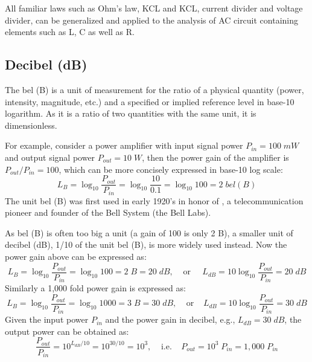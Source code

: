 \documentclass{article}
\begin{document}
All familiar laws such as Ohm's law, KCL and KCL, current divider and voltage
divider, can be generalized and applied to the analysis of AC circuit containing
elements such as L, C as well as R.

\subsection*{Decibel (dB)}

The bel (B) is a unit of measurement for the ratio of a physical quantity 
(power, intensity, magnitude, etc.) and a specified or implied reference 
level in base-10 logarithm. As it is a ratio of two quantities with the same 
unit, it is dimensionless. 

For example, consider a power amplifier with input signal power $P_{in}=100\; mW$ 
and output signal power $P_{out}=10\;W$, then the power gain of the amplifier is 
$P_{out}/P_{in}=100$, which can be more concisely expressed in base-10 log scale:
\begin{equation}
L_B=\log_{10} \frac{P_{out}}{P_{in}}=\log_{10} \frac{10}{0.1} =\log_{10} 100 =2\; bel(B)
\end{equation}
The unit bel (B) was first used in early 1920's in honor of 
,
a telecommunication pioneer and founder of the Bell System (the Bell Labs).

As bel (B) is often too big a unit (a gain of 100 is only 2 B), a smaller
unit of decibel (dB), 1/10 of the unit bel (B), is more widely used instead. 
Now the power gain above can be expressed as:
\begin{equation} L_B=\log_{10}\frac{P_{out}}{P_{in}}=\log_{10} 100 =2\;B=20\;dB,
\;\;\;\;\mbox{or}\;\;\;\;\;
L_{dB}=10 \log_{10}\frac{P_{out}}{P_{in}}=20\;dB \end{equation}
Similarly a 1,000 fold power gain is expressed as:
\begin{equation} 
L_B=\log_{10}\frac{P_{out}}{P_{in}}=\log_{10} 1000 =3\;B=30\;dB,
\;\;\;\;\mbox{or}\;\;\;\;
L_{dB}=10 \log_{10}\frac{P_{out}}{P_{in}}=30\;dB 
\end{equation}
Given the input power $P_{in}$ and the power gain in decibel, e.g., 
$L_{dB}=30\;dB$, the output power can be obtained as:
\begin{equation}
\frac{P_{out}}{P_{in}}=10^{L_{dB}/10}=10^{30/10}=10^3,
\;\;\;\;\mbox{i.e.}\;\;\;\;P_{out} =10^3\;P_{in}=1,000\;P_{in} 
\end{equation}
\end{document}
